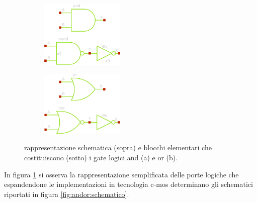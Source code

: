 	\begin{figure}[bht]
		\centering
		\begin{subfigure}{0.48\linewidth}
			\centering \includegraphics[width=4cm]{Immagini/and-simple} \caption{}
		\end{subfigure}
		\begin{subfigure}{0.48\linewidth}
			\centering \includegraphics[width=4cm]{Immagini/or-simple} \caption{}
		\end{subfigure}
		\caption{rappresentazione schematica (sopra) e blocchi elementari che costituiscono (sotto) i gate logici and (a) e or (b).}
		\label{fig:andor:simbolo}
	\end{figure}
	
	In figura \ref{fig:andor:simbolo} si osserva la rappresentazione semplificata delle porte logiche che espandendone le implementazioni in tecnologia c-mos determinano gli schematici riportati in figura \ref{fig:andor:schematico}.
	
